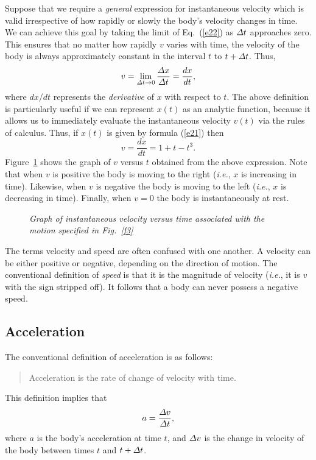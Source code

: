 Suppose that we require a {\em general}  expression for instantaneous velocity which
is valid irrespective of how rapidly or slowly the body's velocity changes in time. 
We can achieve this goal by taking the limit of Eq.~(\ref{e22}) as ${\mit\Delta} t$ approaches
zero. This ensures that no matter how rapidly $v$ varies with time, the velocity
of the body is always approximately constant in the interval $t$ to $t+{\mit\Delta} t$. 
Thus,
\begin{equation}\label{e23}
v = \lim_{{\mit\Delta}t\rightarrow 0}\frac{{\mit\Delta}x}{{\mit\Delta} t}=
\frac{dx}{dt},
\end{equation}
where $dx/dt$ represents the {\em derivative} of $x$ with respect to $t$.  The above definition 
is particularly useful if we can represent $x(t)$ as an
analytic function, because it allows us to  immediately evaluate the instantaneous velocity
$v(t)$ via the rules of calculus. Thus, if $x(t)$ is given by formula (\ref{e21})
then
\begin{equation}
v = \frac{dx}{dt} = 1 + t - t^3.
\end{equation}
Figure~\ref{f4} shows the graph of $v$ versus $t$ obtained from  the above expression.
Note that when $v$ is positive  the body is moving to the right ({\em i.e.}, $x$ is
increasing in time). Likewise, when $v$ is negative  the body is moving to the
left ({\em i.e.}, $x$ is
decreasing  in time). Finally, when $v=0$ the body is instantaneously at rest.

\begin{figure}
\epsfysize=3in
\centerline{}
\caption{\em Graph of instantaneous velocity versus time associated with the motion
specified in Fig.~\ref{f3}}\label{f4}   
\end{figure}

The terms velocity and speed are often confused with one another.
A velocity can be either  positive or negative, depending on the 
direction of motion. The conventional definition of {\em speed} is that
it is the magnitude of velocity ({\em i.e.}, it is $v$ with the sign stripped
off). It follows that a body can never possess a negative speed.

\subsection{Acceleration}
The conventional
definition of acceleration is as follows:
\begin{quote}
{\sf Acceleration is the rate of change of velocity with time.}
\end{quote}
This definition implies that
\begin{equation}\label{e25}
a = \frac{{\mit\Delta}v}{{\mit\Delta} t},
\end{equation}
where $a$ is the body's acceleration at time $t$, and ${\mit\Delta} v$ is the change in velocity
of the body between times $t$ and $t+{\mit\Delta} t$. 

